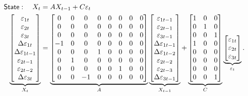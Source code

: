 \documentclass[a4paper,final,12pt]{article}
\begin{document}
\vspace*{-12mm}

\begin{align}
\mathsf{State}:\quad X_{t}& =AX_{t-1}+C\varepsilon _{t} \\
\underbrace{%
\begin{bmatrix}
\varepsilon _{1t} \\ 
\varepsilon _{2t} \\ 
\varepsilon _{3t} \\ 
\Delta \varepsilon _{1t} \\ 
\Delta \varepsilon _{1t-1} \\ 
\varepsilon _{2t-1} \\ 
\varepsilon _{2t-2} \\ 
\Delta \varepsilon _{3t}%
\end{bmatrix}%
}_{X_{t}}& =\underbrace{%
\begin{bmatrix}
0 & 0 & 0 & 0 & 0 & 0 & 0 & 0 \\ 
0 & 0 & 0 & 0 & 0 & 0 & 0 & 0 \\ 
0 & 0 & 0 & 0 & 0 & 0 & 0 & 0 \\ 
-1 & 0 & 0 & 0 & 0 & 0 & 0 & 0 \\ 
0 & 0 & 0 & 1 & 0 & 0 & 0 & 0 \\ 
0 & 1 & 0 & 0 & 0 & 0 & 0 & 0 \\ 
0 & 0 & 0 & 0 & 0 & 1 & 0 & 0 \\ 
0 & 0 & -1 & 0 & 0 & 0 & 0 & 0%
\end{bmatrix}%
}_{A}\underbrace{%
\begin{bmatrix}
\varepsilon _{1t-1} \\ 
\varepsilon _{2t-1} \\ 
\varepsilon _{3t-1} \\ 
\Delta \varepsilon _{1t-1} \\ 
\Delta \varepsilon _{1t-2} \\ 
\varepsilon _{2t-2} \\ 
\varepsilon _{2t-3} \\ 
\Delta \varepsilon _{3t-1}%
\end{bmatrix}%
}_{X_{t-1}}+\underbrace{%
\begin{bmatrix}
1 & 0 & 0 \\ 
0 & 1 & 0 \\ 
0 & 0 & 1 \\ 
1 & 0 & 0 \\ 
0 & 0 & 0 \\ 
0 & 0 & 0 \\ 
0 & 0 & 0 \\ 
0 & 0 & 1%
\end{bmatrix}%
}_{C}\underbrace{%
\begin{bmatrix}
\varepsilon _{1t} \\ 
\varepsilon _{2t} \\ 
\varepsilon _{3t}%
\end{bmatrix}%
}_{\varepsilon _{t}}.
\end{align}%
\esq
\end{document}
